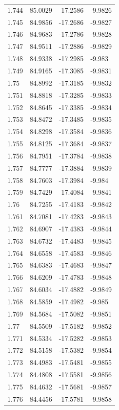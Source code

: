 \begin{tabular}{llll}
1.744 & 85.0029 & -17.2586 & -9.9826 \\
1.745 & 84.9856 & -17.2686 & -9.9827 \\
1.746 & 84.9683 & -17.2786 & -9.9828 \\
1.747 & 84.9511 & -17.2886 & -9.9829 \\
1.748 & 84.9338 & -17.2985 & -9.983 \\
1.749 & 84.9165 & -17.3085 & -9.9831 \\
1.75 & 84.8992 & -17.3185 & -9.9832 \\
1.751 & 84.8818 & -17.3285 & -9.9833 \\
1.752 & 84.8645 & -17.3385 & -9.9834 \\
1.753 & 84.8472 & -17.3485 & -9.9835 \\
1.754 & 84.8298 & -17.3584 & -9.9836 \\
1.755 & 84.8125 & -17.3684 & -9.9837 \\
1.756 & 84.7951 & -17.3784 & -9.9838 \\
1.757 & 84.7777 & -17.3884 & -9.9839 \\
1.758 & 84.7603 & -17.3984 & -9.984 \\
1.759 & 84.7429 & -17.4084 & -9.9841 \\
1.76 & 84.7255 & -17.4183 & -9.9842 \\
1.761 & 84.7081 & -17.4283 & -9.9843 \\
1.762 & 84.6907 & -17.4383 & -9.9844 \\
1.763 & 84.6732 & -17.4483 & -9.9845 \\
1.764 & 84.6558 & -17.4583 & -9.9846 \\
1.765 & 84.6383 & -17.4683 & -9.9847 \\
1.766 & 84.6209 & -17.4783 & -9.9848 \\
1.767 & 84.6034 & -17.4882 & -9.9849 \\
1.768 & 84.5859 & -17.4982 & -9.985 \\
1.769 & 84.5684 & -17.5082 & -9.9851 \\
1.77 & 84.5509 & -17.5182 & -9.9852 \\
1.771 & 84.5334 & -17.5282 & -9.9853 \\
1.772 & 84.5158 & -17.5382 & -9.9854 \\
1.773 & 84.4983 & -17.5481 & -9.9855 \\
1.774 & 84.4808 & -17.5581 & -9.9856 \\
1.775 & 84.4632 & -17.5681 & -9.9857 \\
1.776 & 84.4456 & -17.5781 & -9.9858 \\

\end{tabular}
